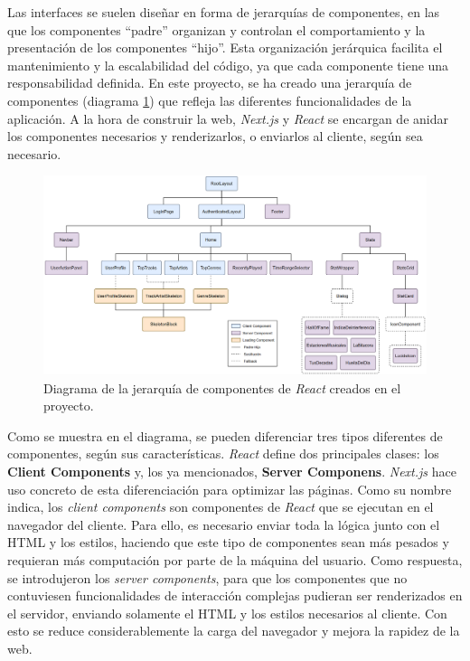 Las interfaces se suelen diseñar en forma de jerarquías de componentes, en las que los componentes ``padre'' organizan y controlan el comportamiento y la presentación de los componentes ``hijo''. Esta organización jerárquica facilita el mantenimiento y la escalabilidad del código, ya que cada componente tiene una responsabilidad definida. En este proyecto, se ha creado una jerarquía de componentes (diagrama \ref{fig:componentes_react}) que refleja las diferentes funcionalidades de la aplicación. A la hora de construir la web, \textit{Next.js} y \textit{React} se encargan de anidar los componentes necesarios y renderizarlos, o enviarlos al cliente, según sea necesario.

\begin{figure}[H]
    \centering
    \includegraphics[width=\textwidth]{figures/componentes_react.png}
    \caption{Diagrama de la jerarquía de componentes de \textit{React} creados en el proyecto.}
    \label{fig:componentes_react}
\end{figure}

Como se muestra en el diagrama, se pueden diferenciar tres tipos diferentes de componentes, según sus características. \textit{React} define dos principales clases: los \textbf{Client Components} y, los ya mencionados, \textbf{Server Componens}. \textit{Next.js} hace uso concreto de esta diferenciación para optimizar las páginas. Como su nombre indica, los \textit{client components} son componentes de \textit{React} que se ejecutan en el navegador del cliente. Para ello, es necesario enviar toda la lógica junto con el HTML y los estilos, haciendo que este tipo de componentes sean más pesados y requieran más computación por parte de la máquina del usuario. Como respuesta, se introdujeron los \textit{server components}, para que los componentes que no contuviesen funcionalidades de interacción complejas pudieran ser renderizados en el servidor, enviando solamente el HTML y los estilos necesarios al cliente. Con esto se reduce considerablemente la carga del navegador y mejora la rapidez de la web.

